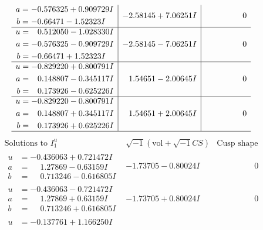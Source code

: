 \documentclass[1p]{elsarticle_modified}
\theoremstyle{definition}
\newcommand{\I}{\sqrt{-1}}
\begin{document}
$$\begin{array}{c|c|c}
\begin{aligned}
a &= -0.576325 + 0.909729 I \\
b &= -0.66471 - 1.52323 I\end{aligned}
 & -2.58145 + 7.06251 I & \phantom{-0.000000 } 0 \\ \hline\begin{aligned}
u &= \phantom{-}0.512050 - 1.028330 I \\
a &= -0.576325 - 0.909729 I \\
b &= -0.66471 + 1.52323 I\end{aligned}
 & -2.58145 - 7.06251 I & \phantom{-0.000000 } 0 \\ \hline\begin{aligned}
u &= -0.829220 + 0.800791 I \\
a &= \phantom{-}0.148807 - 0.345117 I \\
b &= \phantom{-}0.173926 - 0.625226 I\end{aligned}
 & \phantom{-}1.54651 - 2.00645 I & \phantom{-0.000000 } 0 \\ \hline\begin{aligned}
u &= -0.829220 - 0.800791 I \\
a &= \phantom{-}0.148807 + 0.345117 I \\
b &= \phantom{-}0.173926 + 0.625226 I\end{aligned}
 & \phantom{-}1.54651 + 2.00645 I & \phantom{-0.000000 } 0\\
 \hline 
 \end{array}$$\newpage$$\begin{array}{c|c|c}  
\text{Solutions to }I^u_{1}& \I (\text{vol} + \sqrt{-1}CS) & \text{Cusp shape}\\
 \hline 
\begin{aligned}
u &= -0.436063 + 0.721472 I \\
a &= \phantom{-}1.27869 - 0.63159 I \\
b &= \phantom{-}0.713246 - 0.616805 I\end{aligned}
 & -1.73705 - 0.80024 I & \phantom{-0.000000 } 0 \\ \hline\begin{aligned}
u &= -0.436063 - 0.721472 I \\
a &= \phantom{-}1.27869 + 0.63159 I \\
b &= \phantom{-}0.713246 + 0.616805 I\end{aligned}
 & -1.73705 + 0.80024 I & \phantom{-0.000000 } 0 \\ \hline\begin{aligned}
u &= -0.137761 + 1.166250 I \\

\end{aligned}
\end{array}$$
\end{document}
